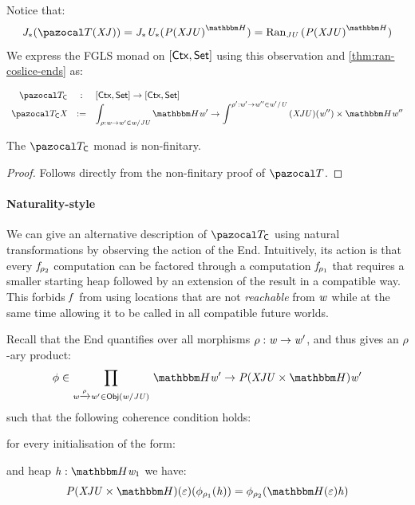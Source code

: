Notice that:
\[ \vJ_* (\monFLS(\vX\vJ)) = \vJ_*\vU_*(\Exp{\vP(\vX\vJ\vU)}\heapF) = \Ran{\vJ\vU}{(\Exp{\vP(\vX\vJ\vU)}\heapF)} \]
We express the FGLS monad on $[\mathsf{Ctx}, \mathsf{Set}]$ using this observation and \cref{thm:ran-coslice-ends} as:

\[\begin{array}{rcl}
    \monFLSCtx & : & \funC\ctxC\setC \to \funC\ctxC\setC \\
    \monFLSCtx\vX & \eqdef & \End{\rho : \vw \to \vw' \in \commaC\vw{\vJ\vU}} \heapF\vw' \to \Coend{\rho' : \vw' \to \vw'' \in \commaC{\vw'}\vU} (\vX\vJ\vU)(\vw'') \times \heapF\vw''
\end{array}\]

\begin{theorem}
    The $\monFLSCtx$ monad is non-finitary.
\end{theorem}
\begin{proof}
    Follows directly from the non-finitary proof of $\monFLS$.
\end{proof}

\paragraph{Naturality-style}
\label{sec:fgls-ctx-natural}

We can give an alternative description of $\monFLSCtx$ using natural transformations by observing the action of the End.
Intuitively, its action is that every $\mathit{f}_{\rho_2}$ computation can be factored through a computation $\mathit{f}_{\rho_1}$ that requires a smaller starting heap followed by an extension of the result in a compatible way.
This forbids $\mathit{f}$ from using locations that are not \emph{reachable} from $\mathit{w}$ while at the same time allowing it to be called in all compatible future worlds.

Recall that the End quantifies over all morphisms $\rho : \mathit{w} \to \mathit{w}'$, and thus gives an $\rho$-ary product: 
\[ \phi \in \Prod{\vw \xto\rho \vw' \in \objC{\commaC\vw{\vJ\vU}}} \heapF\vw' \to \vP(\vX\vJ\vU \times \heapF)\vw' \]
such that the following coherence condition holds:

for every initialisation of the form:
  and heap $\vh : \heapF\vw_1$
we have: \[\vP(\vX\vJ\vU\times\heapF)(\varepsilon)(\phi_{\rho_1}(\vh)) = \phi_{\rho_2}(\heapF(\varepsilon)\vh)\]

